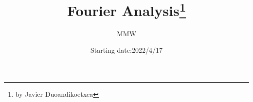 \usepackage{hyperref}
\usepackage{amsmath}
\usepackage{amsfonts}
\usepackage{amsthm}
\usepackage{physics}
\usepackage{amssymb}
\usepackage{color,xcolor}


\hypersetup{
colorlinks=true,
linkcolor=black
}

\newtheorem*{theorem*}{Theorem}

\newtheorem*{lemma*}{Lemma}

{
\theoremstyle{remark}
\newtheorem*{remark*}{\bfseries Remark}
}


\newcommand{\question}[0]{\noindent\textcolor{red}{\large\bfseries Question:\vspace{1ex}}}

\newcommand{\answer}[1]{\noindent\textcolor{cyan}{\large\bfseries Answer:}{ \,\,#1}\hfill \mbox{}  \hfill $\blacksquare$}

\newcommand{\solution}[0]{\noindent\textcolor{cyan}{\large\bfseries Solution:}}

\newcommand{\myend}[0]{\hfill \mbox{}\hfill $\blacksquare$}

\author{MMW}
\date{Starting date:2022/4/17}
\title{Fourier Analysis\footnote{by Javier Duoandikoetxea}}

\endinput
